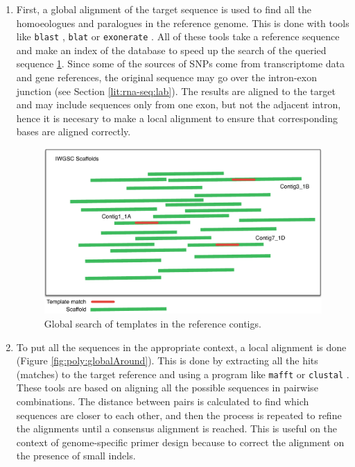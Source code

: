 \begin{enumerate}
\item First, a global alignment of the target sequence is used to find all the homoeologues and paralogues in the reference genome.
This is done with tools like \verb|blast| \citep{Altschul1990}, \verb|blat| \citep{Kent2002} or \verb|exonerate| \citep{Slater2005}.
All of these tools take a reference sequence and make an index of the database to speed up the search of the queried sequence  \ref{fig:poly:globalSearch}. 
Since some of the sources of SNPs come from transcriptome data and gene references, the original sequence may go over the intron-exon junction (see Section \ref{lit:rna-seq:lab}).  
The results are aligned to the target and may include sequences only from one exon, but not the adjacent intron, hence it is necesary to make a local alignment to ensure that corresponding bases are aligned correctly. 

\begin{figure}
\centering
\includegraphics[width=1\textwidth]{PolyMarker/Figures/aln/scaffoldsSearch.pdf}
\caption{Global search of templates in the reference contigs.}
\label{fig:poly:globalSearch}
\end{figure}

\item To put all the sequences in the appropriate context, a local alignment is done (Figure \ref{fig:poly:globalAround}). 
This is done by extracting all the hits (matches) to the target reference and using a program like \verb|mafft| \citep{Katoh2013} or \verb|clustal| \citep{Higgins1988}. 
These tools are based on aligning all the possible sequences in pairwise combinations.
The distance between pairs is calculated to find which sequences are closer to each other, and then the process is repeated to refine the alignments until a consensus alignment is reached. 
This is useful on the context of genome-specific primer design because to correct the alignment on the presence of small \gls{indels}.  


\end{enumerate}
